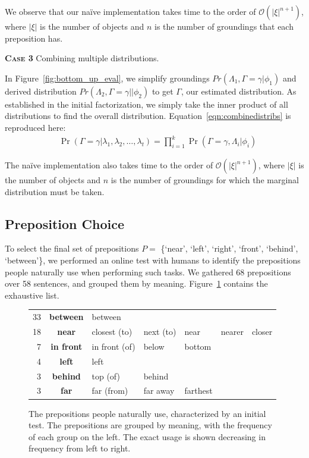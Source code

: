 \documentclass[conference]{IEEEtran}
\numberwithin{equation}{section}
\begin{document}
We observe that our na\"ive implementation takes time to the order of $\mathcal{O}(|\xi|^{n+1})$, where $|\xi|$ is the number of objects and $n$ is the number of groundings that each preposition has.


\textbf{\textsc{Case 3}} Combining multiple distributions.

In Figure~\ref{fig:bottom_up_eval}, we simplify groundings $Pr(\Lambda_1, \Gamma = \gamma | \phi_1)$ and derived distribution $Pr(\Lambda_2, \Gamma = \gamma | | \phi_2)$ to get $\Gamma$, our estimated distribution. As established in the initial factorization, we simply take the inner product of all distributions to find the overall distribution. Equation~\ref{eqn:combinedistribs} is reproduced here:
\begin{align*}
& \Pr(\Gamma = \gamma | \lambda_1, \lambda_2, \ldots, \lambda_t) = 
\prod_{i=1}^k \Pr(\Gamma = \gamma, \Lambda_i | \phi_i)\end{align*}

The na\"ive implementation also takes time to the order of $\mathcal{O}(|\xi|^{n+1})$, where $|\xi|$ is the number of objects and $n$ is the number of groundings for which the marginal distribution must be taken.

\subsection{Preposition Choice}
\label{sec:prepselect}

To select the final set of prepositions $P = $ \{`near', `left', `right', `front', `behind', `between'\}, we performed an online test with humans to identify the prepositions people naturally use when performing such tasks. We gathered 68 prepositions over 58 sentences, and grouped them by meaning. Figure~\ref{fig:prepositionlist} contains the exhaustive list.

\begin{figure}[h!]
  \small
  \centering
  \raggedright
  \setlength\tabcolsep{2pt}
  \begin{tabular}{|r c lllll|}\hline
  33 & \textbf{between} & between &&&& \\
  18 & \textbf{near} & closest (to) & next (to) & near & nearer & closer  \\
  7 & \textbf{in front} & in front (of) & below & bottom && \\
  4 & \textbf{left} & left &&&& \\
  3 & \textbf{behind} & top (of) & behind &&& \\
  3 & \textbf{far} & far (from) & far away & farthest && \\\hline
  \end{tabular}
  \caption{The prepositions people naturally use, characterized by an initial test. The prepositions are grouped by meaning, with the frequency of each group on the left. The exact usage is shown decreasing in frequency from left to right.}
  \label{fig:prepositionlist}
\end{figure}
\end{document}
